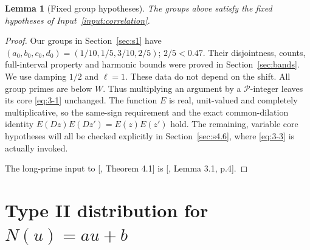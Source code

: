 \documentclass[11pt]{article}
\newtheorem{lemma}[theorem]{Lemma}
\theoremstyle{definition}
\theoremstyle{definition}
\begin{document}
\begin{lemma}[Fixed group hypotheses]\label{lem:group-input}
The groups above satisfy the fixed hypotheses of Input~\ref{input:correlation}.
\end{lemma}
\begin{proof}
Our groups in Section~\ref{sec:s1} have \((a_0,b_0,c_0,d_0)=(1/10,1/5,3/10,2/5)\); \(2/5<0.47\). Their disjointness, counts, full-interval property and harmonic bounds were proved in Section~\ref{sec:bands}. We use damping \(1/2\) and \(\ell=1\). These data do not depend on the shift. All group primes are below \(W\). Thus multiplying an argument by a \(\mathcal P\)-integer leaves its core \eqref{eq:3-1} unchanged. The function \(E\) is real, unit-valued and completely multiplicative, so the same-sign requirement and the exact common-dilation identity
\(E(Dz)E(Dz')=E(z)E(z')\) hold. The remaining, variable core hypotheses will all be checked explicitly in Section~\ref{sec:s4.6}, where \eqref{eq:3-3} is actually invoked.

The long-prime input to [, Theorem 4.1] is [, Lemma 3.1, p.4].



\end{proof}

\section{Type II distribution for \texorpdfstring{\(N(u)=au+b\)}{N(u)=au+b}}\label{sec:s4}
\end{document}
